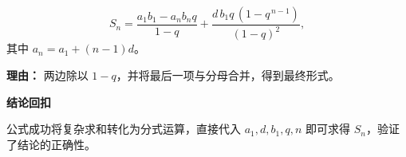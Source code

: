 \begin{proofbox}
\begin{description}[style=nextline, leftmargin=2.8em, labelsep=0.5em, itemsep=0.55em]
		\item[\textbf{步骤七（解出 $S_n$）：}]
			\[
				S_n = \frac{a_1 b_1 - a_n b_n q}{1-q} + \frac{d\,b_1 q\,(1-q^{\,n-1})}{(1-q)^2},
			\]
			其中 $a_n = a_1 + (n-1)d$。
			\par\textbf{理由：} 两边除以 $1-q$，并将最后一项与分母合并，得到最终形式。
	\end{description}

	\medskip
	\textbf{\textcolor{CProof}{结论回扣}}

	公式成功将复杂求和转化为分式运算，直接代入 $a_1,d,b_1,q,n$ 即可求得 $S_n$，验证了结论的正确性。
\end{proofbox}
